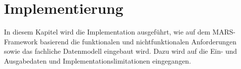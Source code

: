 %


\chapter{Implementierung}\label{ch:implementierung}

In diesem Kapitel wird die Implementation ausgeführt, wie auf dem MARS-Framework basierend die funktionalen und nichtfunktionalen Anforderungen sowie das fachliche Datenmodell eingebaut wird.
Dazu wird auf die Ein- und Ausgabedaten und Implementationslimitationen eingegangen.






